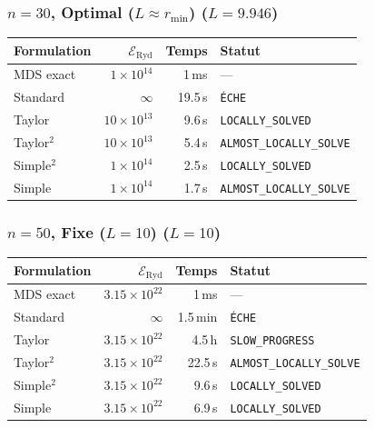 \subsubsection{$n=30$, Optimal ($L{\approx}r_{\min}$) ($L=9.946$)}
\begin{longtable}{@{}lrrl@{}}
  \toprule
  Formulation & $\mathcal{E}_{\mathrm{Ryd}}$ & Temps & Statut \\
  \midrule
  \endhead
  MDS exact & $1\times10^{14}$ & 1\,ms & --- \\
  Standard & $\infty$ & 19.5\,s & \texttt{ÉCHE} \\
  Taylor & $10\times10^{13}$ & 9.6\,s & \texttt{LOCALLY\_SOLVED} \\
  Taylor$^2$ & $10\times10^{13}$ & 5.4\,s & \texttt{ALMOST\_LOCALLY\_SOLVE} \\
  Simple$^2$ & $1\times10^{14}$ & 2.5\,s & \texttt{LOCALLY\_SOLVED} \\
  Simple & $1\times10^{14}$ & 1.7\,s & \texttt{ALMOST\_LOCALLY\_SOLVE} \\
  \bottomrule
\end{longtable}

\subsubsection{$n=50$, Fixe ($L{=}10$) ($L=10$)}
\begin{longtable}{@{}lrrl@{}}
  \toprule
  Formulation & $\mathcal{E}_{\mathrm{Ryd}}$ & Temps & Statut \\
  \midrule
  \endhead
  MDS exact & $3.15\times10^{22}$ & 1\,ms & --- \\
  Standard & $\infty$ & 1.5\,min & \texttt{ÉCHE} \\
  Taylor & $3.15\times10^{22}$ & 4.5\,h & \texttt{SLOW\_PROGRESS} \\
  Taylor$^2$ & $3.15\times10^{22}$ & 22.5\,s & \texttt{ALMOST\_LOCALLY\_SOLVE} \\
  Simple$^2$ & $3.15\times10^{22}$ & 9.6\,s & \texttt{LOCALLY\_SOLVED} \\
  Simple & $3.15\times10^{22}$ & 6.9\,s & \texttt{LOCALLY\_SOLVED} \\
  \bottomrule
\end{longtable}

